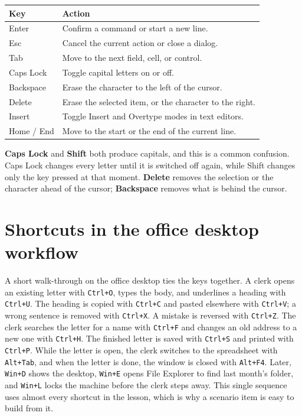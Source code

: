 \begin{center}
\begin{tabular}{p{}p{}}
\toprule
\textbf{Key} & \textbf{Action} \\
\midrule
Enter & Confirm a command or start a new line. \\
Esc & Cancel the current action or close a dialog. \\
Tab & Move to the next field, cell, or control. \\
Caps Lock & Toggle capital letters on or off. \\
Backspace & Erase the character to the left of the cursor. \\
Delete & Erase the selected item, or the character to the right. \\
Insert & Toggle Insert and Overtype modes in text editors. \\
Home / End & Move to the start or the end of the current line. \\
\bottomrule
\end{tabular}
\end{center}

\textbf{Caps Lock} and \textbf{Shift} both produce capitals, and this is a
common confusion. Caps Lock changes every letter until it is switched off
again, while Shift changes only the key pressed at that moment. \textbf{Delete}
removes the selection or the character ahead of the cursor; \textbf{Backspace}
removes what is behind the cursor.

\section{Shortcuts in the office desktop workflow}
A short walk-through on the office desktop ties the keys together. A clerk
opens an existing letter with \texttt{Ctrl+O}, types the body, and underlines a
heading with \texttt{Ctrl+U}. The heading is copied with \texttt{Ctrl+C} and
pasted elsewhere with \texttt{Ctrl+V}; a wrong sentence is removed with
\texttt{Ctrl+X}. A mistake is reversed with \texttt{Ctrl+Z}. The clerk searches
the letter for a name with \texttt{Ctrl+F} and changes an old address to a new
one with \texttt{Ctrl+H}. The finished letter is saved with \texttt{Ctrl+S} and
printed with \texttt{Ctrl+P}. While the letter is open, the clerk switches to
the spreadsheet with \texttt{Alt+Tab}, and when the letter is done, the window
is closed with \texttt{Alt+F4}. Later, \texttt{Win+D} shows the desktop,
\texttt{Win+E} opens File Explorer to find last month's folder, and \texttt{Win+L}
locks the machine before the clerk steps away. This single sequence uses almost
every shortcut in the lesson, which is why a scenario item is easy to build
from it.

